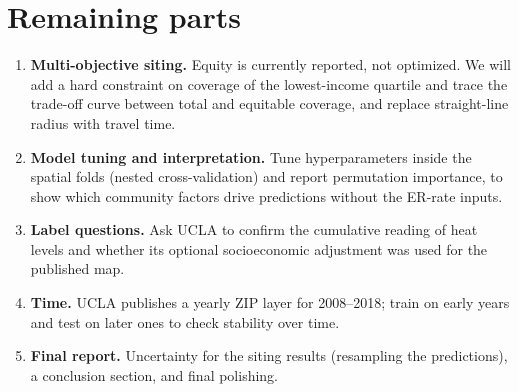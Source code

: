\documentclass[10pt]{article}
\begin{document}
\section{Remaining parts}
\label{sec:remaining}
\begin{enumerate}
\item \textbf{Multi-objective siting.} Equity is currently reported, not optimized. We will add a hard constraint on coverage of the lowest-income quartile and trace the trade-off curve between total and equitable coverage, and replace straight-line radius with travel time.
\item \textbf{Model tuning and interpretation.} Tune hyperparameters inside the spatial folds (nested cross-validation) and report permutation importance, to show which community factors drive predictions without the ER-rate inputs.
\item \textbf{Label questions.} Ask UCLA to confirm the cumulative reading of heat levels and whether its optional socioeconomic adjustment was used for the published map.
\item \textbf{Time.} UCLA publishes a yearly ZIP layer for 2008--2018; train on early years and test on later ones to check stability over time.
\item \textbf{Final report.} Uncertainty for the siting results (resampling the predictions), a conclusion section, and final polishing.
\end{enumerate}
\end{document}

